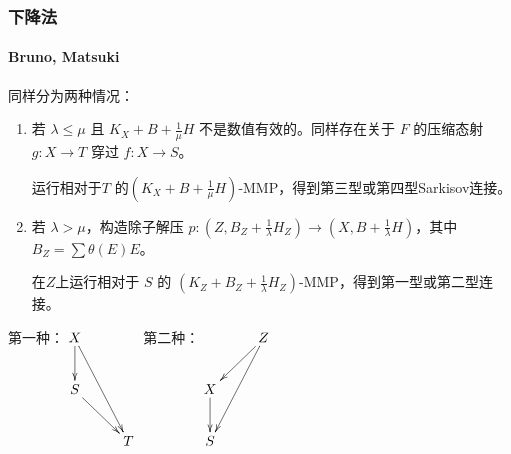 \documentclass[10pt]{ctexbeamer}
\begin{document}
\begin{frame}[shrink]
  \frametitle{下降法}
  \framesubtitle{Bruno, Matsuki}
  同样分为两种情况：
  \begin{enumerate}
    \pause
    \item 
  若 $\lambda\leqslant \mu$ 且 $ K_X+B+\frac{1}{\mu}H $ 不是数值有效的。同样存在关于 $F$ 的压缩态射 $ g:X\to T $  穿过 $ f:X\to S $。

  运行相对于$T$ 的$ (K_X+B+\frac{1}{\mu}H) $-MMP，得到第三型或第四型Sarkisov连接。
    \pause
    \item 
  若 $\lambda>\mu$，构造除子解压 $ p:(Z,B_{Z}+\frac{1}{\lambda}H_Z)\to (X,B+\frac{1}{\lambda}H) $，其中$B_{Z}=\sum \theta(E)E$。

    在$Z$上运行相对于 $S$ 的 $ (K_Z+B_{Z}+\frac{1}{\lambda}H_Z) $-MMP，得到第一型或第二型连接。
  \end{enumerate}

    \pause
\begin{center}
  第一种：$\xymatrix{
      X\ar[d]\ar[rdd]& \\
      S\ar[rd]&\\
         &T }$
  第二种：$\xymatrix{
    &Z\ar[ld]\ar[ldd] \\
      X\ar[d]&\\
      S   & }$
\end{center}

\end{frame}
\end{document}
